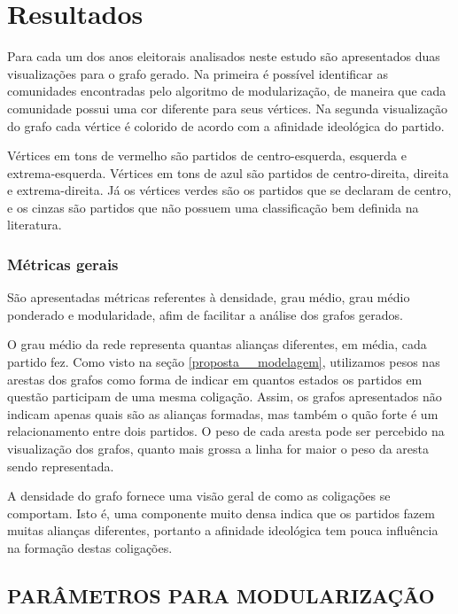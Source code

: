 \chapter{Resultados}
\label{resultados}

Para cada um dos anos eleitorais analisados neste estudo são apresentados duas visualizações para o grafo gerado. Na primeira é possível identificar as comunidades encontradas pelo algoritmo de modularização, de maneira que cada comunidade possui uma cor diferente para seus vértices. Na segunda visualização do grafo cada vértice é colorido de acordo com a afinidade ideológica do partido.

Vértices em tons de vermelho são partidos de centro-esquerda, esquerda e extrema-esquerda. Vértices em tons de azul são partidos de centro-direita, direita e extrema-direita. Já os vértices verdes são os partidos que se declaram de centro, e os cinzas são partidos que não possuem uma classificação bem definida na literatura.

\subsection{Métricas gerais}
\label{proposta__objetivos-especificos--dados-gerais}

São apresentadas métricas referentes à densidade, grau médio, grau médio ponderado e modularidade, afim de facilitar a análise dos grafos gerados.


O grau médio da rede representa quantas alianças diferentes, em média, cada partido fez. Como visto na seção \ref{proposta__modelagem}, utilizamos pesos nas arestas dos grafos como forma de indicar em quantos estados os partidos em questão participam de uma mesma coligação. Assim, os grafos apresentados não indicam apenas quais são as alianças formadas, mas também o quão forte é um relacionamento entre dois partidos. O peso de cada aresta pode ser percebido na visualização dos grafos, quanto mais grossa a linha for maior o peso da aresta sendo representada.

A densidade do grafo fornece uma visão geral de como as coligações se comportam. Isto é, uma componente muito densa indica que os partidos fazem muitas alianças diferentes, portanto a afinidade ideológica tem pouca influência na formação destas coligações.

\section{\texorpdfstring{\MakeUppercase{Parâmetros para modularização}}{}}
\label{resultados__parametros-modularizacao}

